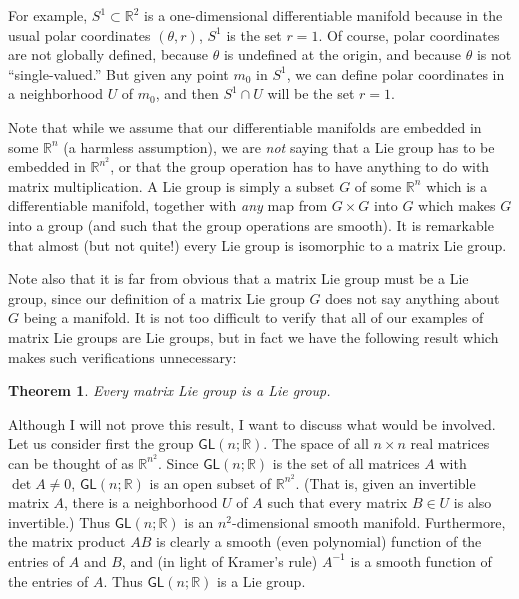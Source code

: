 \documentclass{amsbook}
\theoremstyle{plain}
\newtheorem{theorem}{Theorem}
\numberwithin{equation}{chapter}
\numberwithin{theorem}{chapter}
\begin{document}
For example, $S^{1}\subset\mathbb{R}^{2}$ is a one-dimensional differentiable
manifold because in the usual polar coordinates $(\theta,r)$, $S^{1}$ is the
set $r=1$. Of course, polar coordinates are not globally defined, because
$\theta$ is undefined at the origin, and because $\theta$ is not
``single-valued.'' But given any point $m_{0}$ in $S^{1}$, we can define polar
coordinates in a neighborhood $U$ of $m_{0}$, and then $S^{1}\cap U$ will be
the set $r=1$.

Note that while we assume that our differentiable manifolds are embedded in
some $\mathbb{R}^{n}$ (a harmless assumption), we are \textit{not} saying that
a Lie group has to be embedded in $\mathbb{R}^{n^{2}}$, or that the group
operation has to have anything to do with matrix multiplication. A Lie group
is simply a subset $G$ of some $\mathbb{R}^{n}$ which is a differentiable
manifold, together with \textit{any} map from $G\times G$ into $G$ which makes
$G$ into a group (and such that the group operations are smooth). It is
remarkable that almost (but not quite!) every Lie group is isomorphic to a
matrix Lie group.

Note also that it is far from obvious that a matrix Lie group must be a Lie
group, since our definition of a matrix Lie group $G$ does not say anything
about $G$ being a manifold. It is not too difficult to verify that all of our
examples of matrix Lie groups are Lie groups, but in fact we have the
following result which makes such verifications unnecessary:

\begin{theorem}
\label{lie.theorem}Every matrix Lie group is a Lie group.
\end{theorem}

Although I will not prove this result, I want to discuss what would be
involved. Let us consider first the group $\mathsf{GL}(n;\mathbb{R})$. The
space of all $n\times n$ real matrices can be thought of as $\mathbb{R}%
^{n^{2}}$. Since $\mathsf{GL}(n;\mathbb{R})$ is the set of all matrices $A$
with $\det A\neq0$, $\mathsf{GL}(n;\mathbb{R})$ is an open subset of
$\mathbb{R}^{n^{2}}$. (That is, given an invertible matrix $A$, there is a
neighborhood $U$ of $A$ such that every matrix $B\in U$ is also invertible.)
Thus $\mathsf{GL}(n;\mathbb{R})$ is an $n^{2}$-dimensional smooth manifold.
Furthermore, the matrix product $AB$ is clearly a smooth (even polynomial)
function of the entries of $A$ and $B$, and (in light of Kramer's rule)
$A^{-1}$ is a smooth function of the entries of $A$. Thus $\mathsf{GL}%
(n;\mathbb{R})$ is a Lie group.
\end{document}
